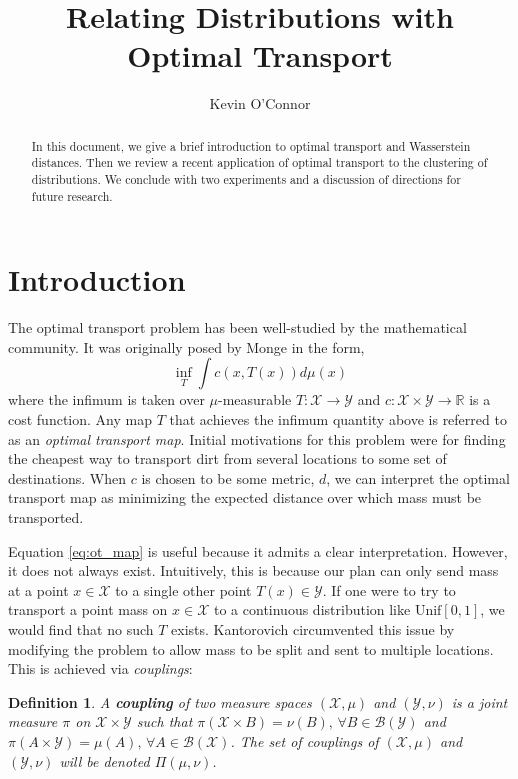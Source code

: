 \documentclass[11pt, a4paper, fleqn]{article}
\title{Relating Distributions with Optimal Transport}
\author{Kevin O'Connor}
\date{}
\let\normalint\int %
\def\int{\displaystyle\normalint} %
\numberwithin{equation}{section}
\numberwithin{figure}{section}
\numberwithin{table}{section}
\newtheorem{defn}[thm]{Definition}
\begin{document}
\maketitle

\begin{abstract}
In this document, we give a brief introduction to optimal transport and Wasserstein distances. Then we review a recent application of optimal transport to the clustering of distributions. We conclude with two experiments and a discussion of directions for future research.
\end{abstract}

\section{Introduction}
The optimal transport problem has been well-studied by the mathematical community. It was originally posed by Monge in the form,
\begin{equation}\label{eq:ot_map}
\inf_T \int c(x, T(x)) d\mu(x)
\end{equation}
where the infimum is taken over $\mu$-measurable $T: \mathcal{X} \rightarrow \mathcal{Y}$ and $c: \mathcal{X}\times \mathcal{Y} \rightarrow \mathbb{R}$ is a cost function. Any map $T$ that achieves the infimum quantity above is referred to as an \textit{optimal transport map}. Initial motivations for this problem were for finding the cheapest way to transport dirt from several locations to some set of destinations. When $c$ is chosen to be some metric, $d$, we can interpret the optimal transport map as minimizing the expected distance over which mass must be transported.

Equation \eqref{eq:ot_map} is useful because it admits a clear interpretation. However, it does not always exist. Intuitively, this is because our plan can only send mass at a point $x \in \mathcal{X}$ to a single other point $T(x) \in \mathcal{Y}$. If one were to try to transport a point mass on $x \in \mathcal{X}$ to a continuous distribution like $\mbox{Unif}[0,1]$, we would find that no such $T$ exists. Kantorovich circumvented this issue by modifying the problem to allow mass to be split and sent to multiple locations. This is achieved via \textit{couplings}:

\begin{defn}
A \textbf{coupling} of two measure spaces $(\mathcal{X}, \mu)$ and $(\mathcal{Y}, \nu)$ is a joint measure $\pi$ on $\mathcal{X} \times \mathcal{Y}$ such that $\pi(\mathcal{X} \times B) = \nu(B), \, \forall B \in \mathcal{B}(\mathcal{Y})$ and $\pi(A \times \mathcal{Y}) = \mu(A), \,\forall A \in \mathcal{B}(\mathcal{X})$. The set of couplings of $(\mathcal{X}, \mu)$ and $(\mathcal{Y}, \nu)$ will be denoted $\Pi(\mu, \nu)$.
\end{defn}
\end{document}
